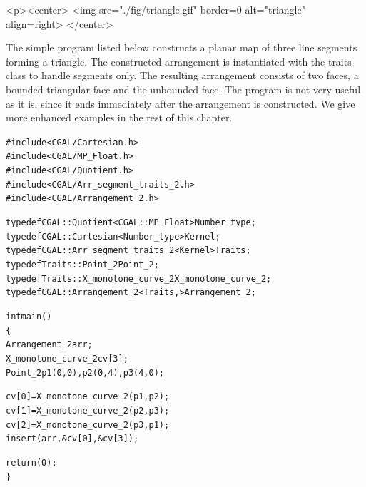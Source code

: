 \lcTex{%
  \setlength{\widthRight}{1.6cm}
  \setlength{\widthLeft}{\widthLineReal}
  \addtolength{\widthLeft}{-\widthRight}
  \begin{minipage}{\widthLeft}
}
\begin{ccHtmlOnly}
  <p><center>
    <img src="./fig/triangle.gif" border=0 alt="triangle" align=right>
  </center>
\end{ccHtmlOnly}
The simple program listed below constructs a planar map of three line
segments forming a triangle. The constructed arrangement is instantiated
with the  traits class to handle segments only.
The resulting arrangement consists of two faces, a bounded triangular face
and the unbounded face.
The program is not very useful as it is, since it ends immediately
after the arrangement is constructed. We give more enhanced examples
in the rest of this chapter.

\begin{alltt}
#include <CGAL/Cartesian.h>
#include <CGAL/MP_Float.h>
#include <CGAL/Quotient.h>
#include <CGAL/Arr_segment_traits_2.h>
#include <CGAL/Arrangement_2.h>

typedef CGAL::Quotient<CGAL::MP_Float>     Number_type;
typedef CGAL::Cartesian<Number_type>       Kernel;
typedef CGAL::Arr_segment_traits_2<Kernel> Traits;
typedef Traits::Point_2                    Point_2;
typedef Traits::X_monotone_curve_2         X_monotone_curve_2;
typedef CGAL::Arrangement_2<Traits,>       Arrangement_2;

int main()
\{
  Arrangement_2       arr;
  X_monotone_curve_2  cv[3];
  Point_2             p1 (0, 0), p2 (0, 4), p3 (4, 0);
 
  cv[0] = X_monotone_curve_2 (p1, p2);
  cv[1] = X_monotone_curve_2 (p2, p3);
  cv[2] = X_monotone_curve_2 (p3, p1);
  insert(arr, &cv[0], &cv[3]);

  return (0);
\}
\end{alltt}

